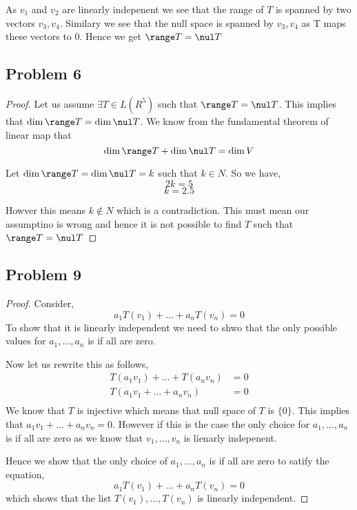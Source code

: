 \documentclass[a4paper]{report}
\begin{document}
As $v_1$ and $v_2$ are linearly indepenent we see that the range of $T$ is spanned by two vectors $v_3,v_4$. Similary we see that the null space is spanned by $v_3,v_4$ as T maps these vectors to 0. Hence we get $\range T = \nul T$

\subsection*{Problem 6}
\begin{proof}
Let us assume $\exists T \in L(R^{5})$ such that $\range T = \nul T$. This implies that $\dim \range T = \dim \nul T$.  We know from the fundamental theorem of linear map that  
$$ \dim \range T  + \dim \nul T = \dim V $$ 

Let $\dim \range T = \dim \nul T = k$ such that $ k \in N$. So we have,  
$$ 2k = 5 $$ 
$$ k = 2.5 $$ 

Howver this means $k \not \in N$ which is a contradiction. This must mean our assumptino is wrong and hence it is not possible to find $T$ such that $\range T = \nul T$
\end{proof}


\subsection*{Problem 9}
\begin{proof}
    Consider, 
    $$ a_1T(v_1) + \dots + a_nT(v_n)= 0 $$ 
    To show that it is linearly independent we need to shwo that the only possible values for $a_1,\dots,a_n $ is if all are zero.

    Now let us rewrite this as follows, 
    \begin{align*}
        T(a_1v_1) + \dots + T(a_nv_n) &= 0\\
        T(a_1v_1 + \dots + a_nv_n) &= 0\\
    \end{align*}
    We know that $T$ is injective which means that null space of $T$ is $\{0\}$. This implies that  $a_1v_1 + \dots + a_nv_n = 0$. However  if this is the case the only choice for $a_1,\dots,a_n $ is if all are zero as we know that  $v_1,\dots,v_n$ is lienarly indepenent.

    Hence we show that the only choice of $a_1,\dots,a_n$ is if all are zero to satify the equation, 
    $$ a_1T(v_1) + \dots + a_nT(v_n) = 0 $$  which shows that the list $T(v_1), \dots, T(v_n)$ is linearly independent.
\end{proof}
\end{document}

